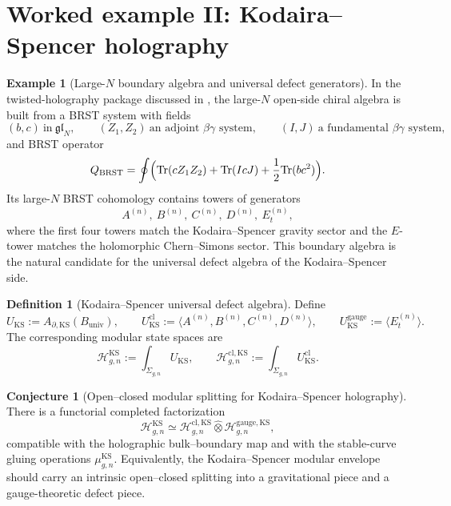 \documentclass[11pt]{article}
\theoremstyle{definition}
\newtheorem{definition}[theorem]{Definition}
\newtheorem{conjecture}[theorem]{Conjecture}
\newtheorem{example}[theorem]{Example}
\theoremstyle{remark}
\newcommand{\Hh}{\mathcal H}
\newcommand{\cl}{\mathrm{cl}}
\newcommand{\bbeta}{\beta}
\newcommand{\bgamma}{\gamma}
\begin{document}
\section{Worked example II: Kodaira--Spencer holography}\label{sec:KS}

\begin{example}[Large-$N$ boundary algebra and universal defect generators]\label{ex:KS-boundary-algebra}
In the twisted-holography package discussed in \cite{Zeng2024,KZ2025}, the large-$N$ open-side chiral algebra is built from a BRST system with fields
\[
(b,c)\ \text{in}\ \mathfrak{gl}_N,
\qquad
(Z_1,Z_2)\ \text{an adjoint $\bbeta\bgamma$ system},
\qquad
(I,J)\ \text{a fundamental $\bbeta\bgamma$ system},
\]
and BRST operator
\[
Q_{\mathrm{BRST}}
=
\oint \Bigl(
\mathrm{Tr}(cZ_1Z_2)
+
\mathrm{Tr}(IcJ)
+
\frac{1}{2}\mathrm{Tr}(bc^2)
\Bigr).
\]
Its large-$N$ BRST cohomology contains towers of generators
\[
A^{(n)},\ B^{(n)},\ C^{(n)},\ D^{(n)},\ E_t^{(n)},
\]
where the first four towers match the Kodaira--Spencer gravity sector and the $E$-tower matches the holomorphic Chern--Simons sector. This boundary algebra is the natural candidate for the universal defect algebra of the Kodaira--Spencer side.
\end{example}

\begin{definition}[Kodaira--Spencer universal defect algebra]\label{def:KS-universal-defect}
Define
\[
U_{\mathrm{KS}}
:=
A_{\partial,\mathrm{KS}}(B_{\mathrm{univ}}),
\qquad
U_{\mathrm{KS}}^{\cl}
:=
\langle A^{(n)},B^{(n)},C^{(n)},D^{(n)}\rangle,
\qquad
U_{\mathrm{KS}}^{\mathrm{gauge}}
:=
\langle E_t^{(n)}\rangle.
\]
The corresponding modular state spaces are
\[
\Hh_{g,n}^{\mathrm{KS}}:=\int_{\Sigma_{g,n}}U_{\mathrm{KS}},
\qquad
\Hh_{g,n}^{\cl,\mathrm{KS}}:=\int_{\Sigma_{g,n}}U_{\mathrm{KS}}^{\cl}.
\]
\end{definition}

\begin{conjecture}[Open--closed modular splitting for Kodaira--Spencer holography]\label{conj:KS-splitting}
There is a functorial completed factorization
\[
\Hh_{g,n}^{\mathrm{KS}}
\simeq
\Hh_{g,n}^{\cl,\mathrm{KS}}
\widehat\otimes
\Hh_{g,n}^{\mathrm{gauge},\mathrm{KS}},
\]
compatible with the holographic bulk--boundary map and with the stable-curve gluing operations $\mu^{\mathrm{KS}}_{g,n}$. Equivalently, the Kodaira--Spencer modular envelope should carry an intrinsic open--closed splitting into a gravitational piece and a gauge-theoretic defect piece.
\end{conjecture}
\end{document}
